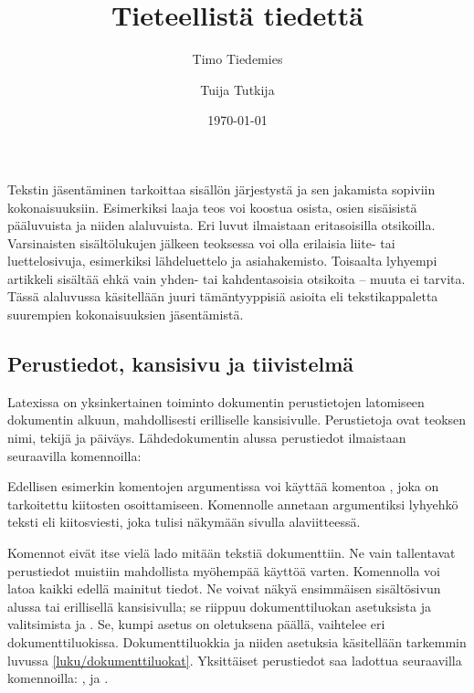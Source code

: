 Tekstin jäsentäminen tarkoittaa sisällön järjestystä ja sen jakamista
sopiviin kokonaisuuksiin. Esimerkiksi laaja teos voi koostua osista,
osien sisäisistä pääluvuista ja niiden alaluvuista. Eri luvut ilmaistaan
eritasoisilla otsikoilla. Varsinaisten sisältölukujen jälkeen teoksessa
voi olla erilaisia liite- tai luettelosivuja, esimerkiksi lähdeluettelo
ja asiahakemisto. Toisaalta lyhyempi artikkeli sisältää ehkä vain yhden-
tai kahdentasoisia otsikoita -- muuta ei tarvita. Tässä alaluvussa
käsitellään juuri tämäntyyppisiä asioita eli tekstikappaletta suurempien
kokonaisuuksien jäsentämistä.

\subsection{Perustiedot, kansisivu ja tiivistelmä}
\label{luku/dokumentin-perustiedot}

Latexissa on yksinkertainen toiminto dokumentin perustietojen latomiseen
dokumentin alkuun, mahdollisesti erilliselle kansisivulle. Perustietoja
ovat teoksen nimi, tekijä ja päiväys. Lähdedokumentin alussa perustiedot
ilmaistaan seuraavilla komennoilla:

\begin{koodilohkosis}
\title{Tieteellistä tiedettä}              %
\author{Timo Tiedemies \and Tuija Tutkija} %
\date{\today}                              %
\end{koodilohkosis}

\noindent
Edellisen esimerkin komentojen argumentissa voi käyttää komentoa
, joka on tarkoitettu kiitosten osoittamiseen.
Komennolle annetaan argumentiksi lyhyehkö teksti eli kiitosviesti, joka
tulisi näkymään sivulla alaviitteessä.

Komennot eivät itse vielä lado mitään tekstiä dokumenttiin. Ne vain
tallentavat perustiedot muistiin mahdollista myöhempää käyttöä varten.
Komennolla  voi latoa kaikki edellä mainitut tiedot.
Ne voivat näkyä ensimmäisen sisältösivun alussa tai erillisellä
kansisivulla; se riippuu dokumenttiluokan asetuksista ja valitsimista
 ja . Se, kumpi asetus on oletuksena
päällä, vaihtelee eri dokumenttiluokissa. Dokumenttiluokkia ja niiden
asetuksia käsitellään tarkemmin luvussa \ref{luku/dokumenttiluokat}.
Yksittäiset perustiedot saa ladottua seuraavilla komennoilla:
,  ja .

